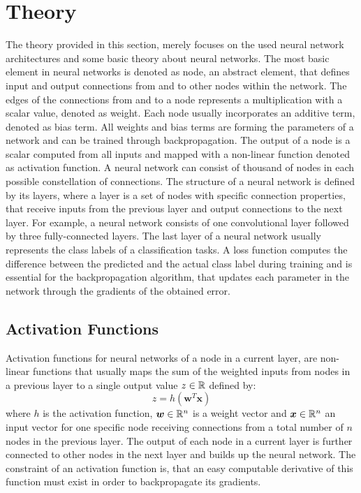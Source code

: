 
\section{Theory}\label{sec:nn_theory}
\thesisStateRevised
The theory provided in this section, merely focuses on the used neural network architectures and some basic theory about neural networks.
The most basic element in neural networks is denoted as node, an abstract element, that defines input and output connections from and to other nodes within the network.
The edges of the connections from and to a node represents a multiplication with a scalar value, denoted as weight.
Each node usually incorporates an additive term, denoted as bias term.
All weights and bias terms are forming the parameters of a network and can be trained through backpropagation.
The output of a node is a scalar computed from all inputs and mapped with a non-linear function denoted as activation function.
A neural network can consist of thousand of nodes in each possible constellation of connections.
The structure of a neural network is defined by its layers, where a layer is a set of nodes with specific connection properties, that receive inputs from the previous layer and output connections to the next layer.
For example, a neural network consists of one convolutional layer followed by three fully-connected layers.
The last layer of a neural network usually represents the class labels of a classification tasks.
A loss function computes the difference between the predicted and the actual class label during training and is essential for the backpropagation algorithm, that updates each parameter in the network through the gradients of the obtained error.



\subsection{Activation Functions}\label{sec:nn_theory_acti}
Activation functions for neural networks of a node in a current layer, are non-linear functions that usually maps the sum of the weighted inputs from nodes in a previous layer to a single output value $z \in \mathbb{R}$ defined by:
\begin{equation}\label{eq:nn_theory_acti}
  z = h(\bm{w}^T \bm{x})
\end{equation}
where $h$ is the activation function, $\bm{w} \in \mathbb{R}^n$ is a weight vector and $\bm{x} \in \mathbb{R}^n$ an input vector for one specific node receiving connections from a total number of $n$ nodes in the previous layer.
The output of each node in a current layer is further connected to other nodes in the next layer and builds up the neural network.
The constraint of an activation function is, that an easy computable derivative of this function must exist in order to backpropagate its gradients.

